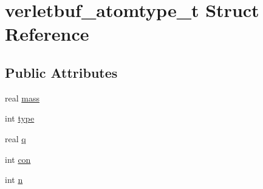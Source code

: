 \hypertarget{structverletbuf__atomtype__t}{\section{verletbuf\-\_\-atomtype\-\_\-t \-Struct \-Reference}
\label{structverletbuf__atomtype__t}
}
\subsection*{\-Public \-Attributes}
\begin{DoxyCompactItemize}
\item 
real \hyperlink{structverletbuf__atomtype__t_a94eec80ecfe84c264488d0a6d2857cc5}{mass}
\item 
int \hyperlink{structverletbuf__atomtype__t_ad5277b4fc99f12a3d46eda97a2650aa8}{type}
\item 
real \hyperlink{structverletbuf__atomtype__t_a4fafcf81c7af586f1e08bbcd43666adb}{q}
\item 
int \hyperlink{structverletbuf__atomtype__t_abaac3df59f28024779971c44b56c6dd4}{con}
\item 
int \hyperlink{structverletbuf__atomtype__t_a288b199386422f8781b4fb594a9b34a8}{n}
\end{DoxyCompactItemize}


